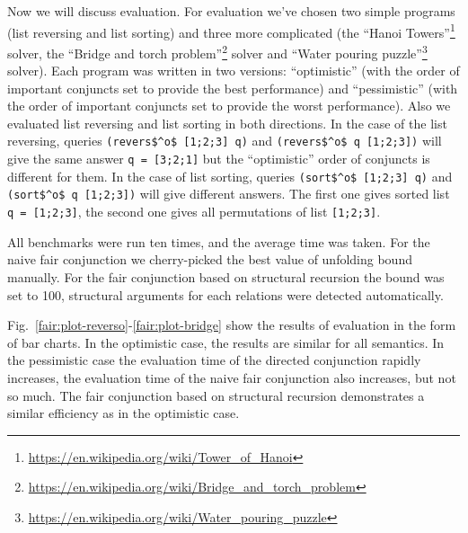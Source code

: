 Now we will discuss evaluation. For evaluation we've chosen two simple programs (list reversing and list sorting) and three more complicated (the ``Hanoi Towers''\footnote{\url{https://en.wikipedia.org/wiki/Tower_of_Hanoi}} solver, the
``Bridge and torch problem''\footnote{\url{https://en.wikipedia.org/wiki/Bridge_and_torch_problem}} solver and ``Water pouring puzzle''\footnote{\url{https://en.wikipedia.org/wiki/Water_pouring_puzzle}} solver).
Each program was written in two versions: ``optimistic'' (with the order of important conjuncts set to provide the best performance) and ``pessimistic'' (with the order of important
conjuncts set to provide the worst performance). Also we evaluated list reversing and list sorting in both directions. In the case of the list reversing, queries \lstinline{(revers$^o$ [1;2;3] q)} and \lstinline{(revers$^o$ q [1;2;3])}\! will give the same answer \lstinline{q = [3;2;1]} but the ``optimistic'' order of conjuncts is different for them. In the case of list sorting, queries \lstinline{(sort$^o$ [1;2;3] q)} and \lstinline{(sort$^o$ q [1;2;3])} will give different answers. The first one gives sorted list \lstinline{q = [1;2;3]}, the second one gives all permutations of list \lstinline{[1;2;3]}\!\!. 

All benchmarks were run ten times, and the average time was taken. For the naive fair conjunction we cherry-picked the best value of unfolding bound manually. For the fair conjunction
based on structural recursion the bound was set to 100, structural arguments for each relations were detected automatically.

Fig.~\ref{fair:plot-reverso}-\ref{fair:plot-bridge} show the results of evaluation in the form of bar charts. In the optimistic case, the results are similar for all semantics.
In the pessimistic case the evaluation time of the directed conjunction rapidly increases, the evaluation time of the naive fair conjunction also increases, but not so much.
The fair conjunction based on structural recursion demonstrates a similar efficiency as in the optimistic case.

